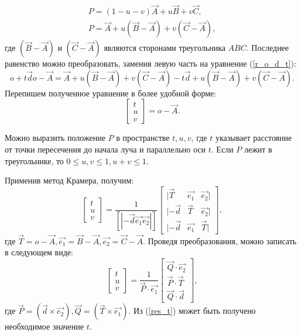 \begin{eqnarray}
	P = (1 - u - v)\vec{A} + u\vec{B} + v\vec{C},\\
	P = \vec{A} + u(\vec{B} - \vec{A}) + v(\vec{C} - \vec{A}),
\end{eqnarray}
где $(\vec{B} - \vec{A})$ и $(\vec{C} - \vec{A})$ являются сторонами треугольника  $ABC$. Последнее равенство можно преобразовать, заменив левую часть на уравнение (\ref{r_o_d_t}):
\begin{equation}
	o + t\vec{d}o - \vec{A} = \vec{A} + u(\vec{B} - \vec{A}) + v(\vec{C} - \vec{A}) - t\vec{d} + u(\vec{B} - \vec{A}) + v(\vec{C} - \vec{A}).
\end{equation}
Перепишем полученное уравнение в более удобной форме:
\begin{equation}
	[-\vec{d}(\vec{B} - \vec{A})(\vec{C} - \vec{A})]\begin{bmatrix}
	t\\ u\\ v
	\end{bmatrix} = o - \vec{A}.
\end{equation}

Можно выразить положение $P$ в пространстве $t, u, v$, где $t$ указывает расстояние от точки пересечения до начала луча и параллельно оси $t$. Если $P$ лежит в треугольнике, то $0 \leq u, v \leq 1, u + v \leq 1$.

Применив метод Крамера, получим:
\begin{equation}
	\begin{bmatrix}
		t\\ u\\ v
	\end{bmatrix} = \frac{1}{[|-\vec{d} \vec{e_1} \vec{e_2}|]} 
	\begin{bmatrix}
		|\vec{T} & \vec{e_1} & \vec{e_2}|\\
		|-\vec{d} & \vec{T} & \vec{e_2}|\\
		|-\vec{d} & \vec{e_1} & \vec{T}|
	\end{bmatrix},
\end{equation}
где $\vec{T} = o - \vec{A}, \vec{e_1} = \vec{B} - \vec{A}, \vec{e_2} = \vec{C} - \vec{A}$. Проведя преобразования, можно записать в следующем виде:
\begin{equation}\label{res_t}
	\begin{bmatrix}
	t\\ u\\ v
	\end{bmatrix} = \frac{1}{\vec{P} \cdot \vec{e_1}}
	\begin{bmatrix}
		\vec{Q} \cdot \vec{e_2}\\
		\vec{P} \cdot \vec{T}\\
		\vec{Q} \cdot \vec{d}
	\end{bmatrix},
\end{equation}
где $\vec{P} = (\vec{d} \times \vec{e_2}), \vec{Q} = (\vec{T} \times \vec{e_1})$. Из (\ref{res_t}) может быть получено необходимое значение $t$.


